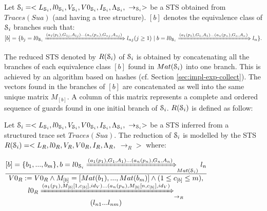 \begin{definition}
Let
$\EuScript{S}_i=<L_{\EuScript{S}_i},l0_{\EuScript{S}_i},V_{\EuScript{S}_i},V0_{\EuScript{S}_i},I_{\EuScript{S}_i},\Lambda_{\EuScript{S}_i},$
$\rightarrow_{\EuScript{S}_i}>$ be a STS obtained from
$Traces(Sua)$ (and having a tree structure). $[b]$ denotes the
equivalence class of $\EuScript{S}_i$ branches such that: $[b]=\{
b_j= l0_{\EuScript{S}_i}\\
\xRightarrow{(a_1(p_1),G_{1j},A_{1j})\dots(a_n(p_n),G_{nj},A_{nj})}
l_{nj}(j\geq 1) \mid b=l0_{\EuScript{S}_i}
\xRightarrow{(a_1(p_1),G_{1},A_{1})\dots(a_n(p_n),G_{n},A_{n})}
l_n\}.$
\end{definition}

The reduced STS denoted by $R(\EuScript{S}_i)$ of
$\EuScript{S}_i$ is obtained by concatenating all the branches of
each equivalence class $[b]$ found in $Mat(\EuScript{S}_i)$ into
one branch. This is achieved by an algorithm based on hashes (cf.
Section \ref{sec:impl-exp-collect}). The vectors found in the
branches of $[b]$ are concatenated as well into the same unique
matrix $M_{[b]}$. A column of this matrix represents a complete
and ordered sequence of guards found in one initial branch of
$\EuScript{S}_i$. $R(\EuScript{S}_i)$ is defined as follow:

\begin{definition}
	\label{rule:min}

	Let $\EuScript{S}_i=<L_{\EuScript{S}_i},l0_{\EuScript{S}_i},V_{\EuScript{S}_i},V0_{\EuScript{S}_i},I_{\EuScript{S}_i},\Lambda_{\EuScript{S}_i},$ $\rightarrow_{\EuScript{S}_i}>$ be
    a STS inferred from a structured trace set $Traces(Sua)$. The reduction of $\EuScript{S}_i$ is modelled by the STS
	$R(\EuScript{S}_i)= <L_R,l0_R,V_R,V0_R,I_R,\Lambda_R,$
	$\rightarrow_R>$ where:

  \begin{center}
      {\Large
  $\frac{\begin{matrix}
      [b]=\{b_1,...,b_m\},
      b=l0_{\EuScript{S}_i} \xRightarrow{(a_1(p_1),G_{1},A_{1})...(a_n(p_n),G_{n},A_{n})}_{Mat(\EuScript{S}_i)} l_{n}\\
    \end{matrix}
  }
  {\begin{matrix}
      V0_R:=V0_R \wedge M_{[b]}=[Mat(b_1),...,Mat(b_m)] \wedge (1 \leq c_{[b]} \leq m),\\
      l0_R \xRightarrow{(a_1(p_1),M_{[b]}[1,c_{[b]}],id_V)... (a_n(p_n),M_{[b]}[n,c_{[b]}],id_V)}_{\rightarrow_R}\\  (l_{n1}...l_{nm})
    \end{matrix}
  }$
  }
  \end{center}
\end{definition}

